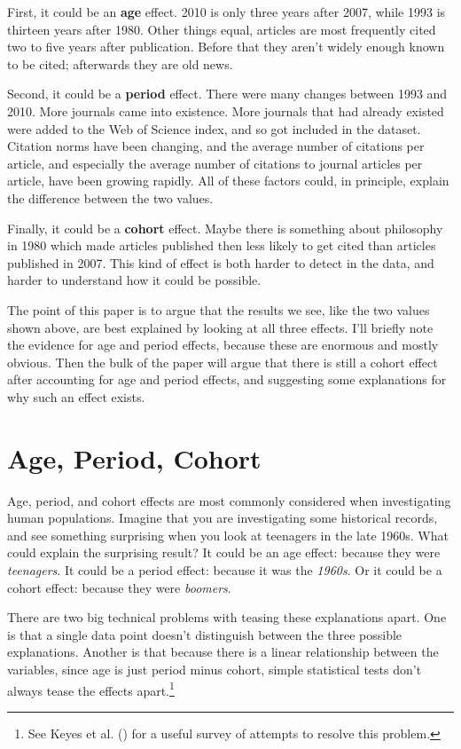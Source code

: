 \documentclass[
  10pt,
  letterpaper,
  DIV=11,
  numbers=noendperiod,
  twoside]{scrartcl}
\begin{document}
First, it could be an \textbf{age} effect. 2010 is only three years
after 2007, while 1993 is thirteen years after 1980. Other things equal,
articles are most frequently cited two to five years after publication.
Before that they aren't widely enough known to be cited; afterwards they
are old news.

Second, it could be a \textbf{period} effect. There were many changes
between 1993 and 2010. More journals came into existence. More journals
that had already existed were added to the Web of Science index, and so
got included in the dataset. Citation norms have been changing, and the
average number of citations per article, and especially the average
number of citations to journal articles per article, have been growing
rapidly. All of these factors could, in principle, explain the
difference between the two values.

Finally, it could be a \textbf{cohort} effect. Maybe there is something
about philosophy in 1980 which made articles published then less likely
to get cited than articles published in 2007. This kind of effect is
both harder to detect in the data, and harder to understand how it could
be possible.

The point of this paper is to argue that the results we see, like the
two values shown above, are best explained by looking at all three
effects. I'll briefly note the evidence for age and period effects,
because these are enormous and mostly obvious. Then the bulk of the
paper will argue that there is still a cohort effect after accounting
for age and period effects, and suggesting some explanations for why
such an effect exists.

\section{Age, Period, Cohort}\label{sec-apc}

Age, period, and cohort effects are most commonly considered when
investigating human populations. Imagine that you are investigating some
historical records, and see something surprising when you look at
teenagers in the late 1960s. What could explain the surprising result?
It could be an age effect: because they were \emph{teenagers}. It could
be a period effect: because it was the \emph{1960s}. Or it could be a
cohort effect: because they were \emph{boomers}.

There are two big technical problems with teasing these explanations
apart. One is that a single data point doesn't distinguish between the
three possible explanations. Another is that because there is a linear
relationship between the variables, since age is just period minus
cohort, simple statistical tests don't always tease the effects
apart.\footnote{See Keyes et al. ()
  for a useful survey of attempts to resolve this problem.}
\end{document}
